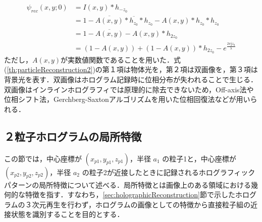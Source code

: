 \begin{align}
    \label{th:particleReconstruction}
    \psi_{rec}(x,y;0) &= I(x,y) * h_{-z_0} \\
    &= 1 - \overline{A(x,y)}*\overline{h_{z_0}}*h_{z_0} - A(x,y)*h_{z_0}*h_{z_0} \\
    &= 1 - \overline{A(x,y)} - A(x,y)*h_{2z_0} \\
    \label{th:particleReconstruction2}
    &= \left( 1 - A(x,y) \right) + (1 - A(x,y))*h_{2z_0} - e^{\frac{2\pi \mathrm{j}z_0}{\lambda}}
\end{align}
ただし，$A(x,y)$が実数値関数であることを用いた．式(\ref{th:particleReconstruction2})の第１項は物体光を，第２項は双画像を，第３項は背景光を表す．双画像はホログラム記録時に位相分布が失われることで生じる．双画像はインラインホログラフィでは原理的に除去できないため，Off-axis法\cite{offaxis}や位相シフト法\cite{phaseshift}，Gerchberg-Saxtonアルゴリズムを用いた位相回復法\cite{phaseretrieval}などが用いられる．

\subsection{２粒子ホログラムの局所特徴}
この節では，中心座標が $(x_{p1},y_{p1},z_{p1})$，半径 $a_1$ の粒子1と，中心座標が$(x_{p2},y_{p2},z_{p2})$，半径 $a_2$ の粒子2が近接したときに記録されるホログラフィックパターンの局所特徴について述べる．局所特徴とは画像上のある領域における幾何的な特徴を指す．すなわち，\ref{sec:holographicReconstruction}節で示したホログラムの３次元再生を行わず，ホログラムの画像としての特徴から直接粒子組の近接状態を識別することを目的とする．

